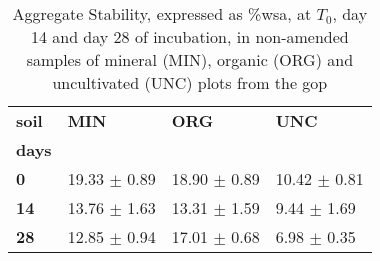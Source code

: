 \begin{table}[H]
\centering
\caption{Aggregate Stability, expressed as \%\gls{wsa}, at $ T_0 $, day 14 and day 28 of incubation, in non-amended samples of mineral (MIN), organic (ORG) and uncultivated (UNC) plots from the \gls{gop}}
\label{as_main_control}
\begin{tabular}{llll}
\toprule
\textbf{soil} &            \textbf{MIN} &            \textbf{ORG} &            \textbf{UNC} \\
\textbf{days} &                &                &                \\
\midrule
\textbf{0   } &  19.33 $ \pm $  0.89 &  18.90 $ \pm $  0.89 &  10.42 $ \pm $  0.81 \\
\textbf{14  } &  13.76 $ \pm $  1.63 &  13.31 $ \pm $  1.59 &   9.44 $ \pm $  1.69 \\
\textbf{28  } &  12.85 $ \pm $  0.94 &  17.01 $ \pm $  0.68 &   6.98 $ \pm $  0.35 \\
\bottomrule
\end{tabular}
\end{table}
